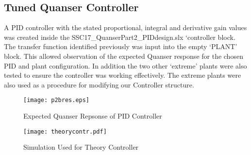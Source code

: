 \subsection{Tuned Quanser Controller}\label{tuned-quanser-controller}

A PID controller with the stated proportional, integral and derivative
gain values was created inside the SSC17\_QuanserPart2\_PIDdesign.slx
`controller block. The transfer function identified previously was input
into the empty `PLANT' block. This allowed observation of the expected
Quanser response for the chosen PID and plant configuration. In addition
the two other `extreme' plants were also tested to ensure the controller
was working effectively. The extreme plants were also used as a
procedure for modifying our Controller structure.

\begin{figure}[H]
\centering
\begin{minipage}{.495\textwidth}
 \centering
 \texttt{[image: p2bres.eps]}
 \vspace{-20pt}
 \caption{Expected Quanser Repsonse of PID Controller}
 \label{p2bres}
\end{minipage}
\hfill
\begin{minipage}{.495\textwidth}
\centering
\texttt{[image: theorycontr.pdf]}
\vspace{-10pt}
\caption{Simulation Used for Theory Controller}
\label{paramtab}
\end{minipage}
\vspace{-20pt}
\end{figure}
